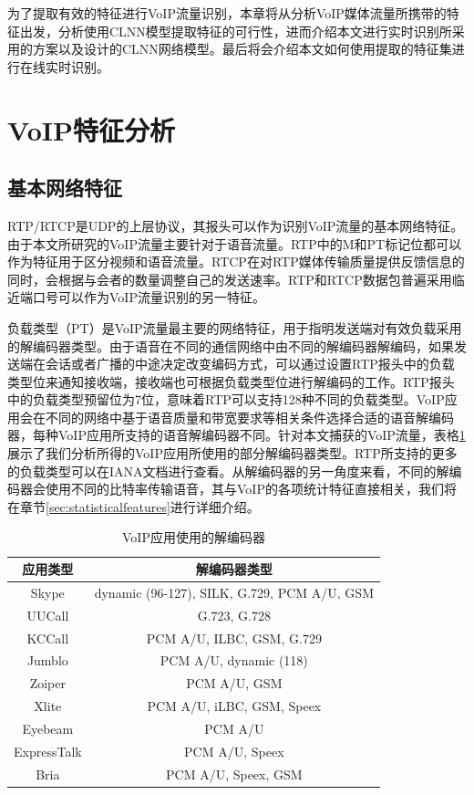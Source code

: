 为了提取有效的特征进行VoIP流量识别，本章将从分析VoIP媒体流量所携带的特征出发，分析使用CLNN模型提取特征的可行性，进而介绍本文进行实时识别所采用的方案以及设计的CLNN网络模型。最后将会介绍本文如何使用提取的特征集进行在线实时识别。
\section{VoIP特征分析}

\subsection{基本网络特征}
RTP/RTCP是UDP的上层协议，其报头可以作为识别VoIP流量的基本网络特征。由于本文所研究的VoIP流量主要针对于语音流量。RTP中的M和PT标记位都可以作为特征用于区分视频和语音流量。RTCP在对RTP媒体传输质量提供反馈信息的同时，会根据与会者的数量调整自己的发送速率。RTP和RTCP数据包普遍采用临近端口号可以作为VoIP流量识别的另一特征。

负载类型（PT）是VoIP流量最主要的网络特征，用于指明发送端对有效负载采用的解编码器类型。由于语音在不同的通信网络中由不同的解编码器解编码，如果发送端在会话或者广播的中途决定改变编码方式，可以通过设置RTP报头中的负载类型位来通知接收端，接收端也可根据负载类型位进行解编码的工作。RTP报头中的负载类型预留位为7位，意味着RTP可以支持128种不同的负载类型。VoIP应用会在不同的网络中基于语音质量和带宽要求等相关条件选择合适的语音解编码器，每种VoIP应用所支持的语音解编码器不同。针对本文捕获的VoIP流量，表格\ref{tab:codecs}展示了我们分析所得的VoIP应用所使用的部分解编码器类型。RTP所支持的更多的负载类型可以在IANA文档\supercite{rtppt}进行查看。从解编码器的另一角度来看，不同的解编码器会使用不同的比特率传输语音，其与VoIP的各项统计特征直接相关，我们将在章节\ref{sec:statisticalfeatures}进行详细介绍。

\begin{table}[htbp]
  \caption{VoIP应用使用的解编码器}
  \label{tab:codecs}
  \centering
  \begin{tabular}{c c}
    \hline
    \textbf{应用类型} & \textbf{解编码器类型}\\
    \hline
    Skype      & dynamic (96-127), SILK, G.729, PCM A/U, GSM  \\
    UUCall      & G.723, G.728  \\
    KCCall      & PCM A/U, ILBC, GSM, G.729  \\
    Jumblo      & PCM A/U, dynamic (118)  \\
    Zoiper      & PCM A/U, GSM  \\
    Xlite      &  PCM A/U, iLBC, GSM, Speex \\
    Eyebeam      & PCM A/U  \\
    ExpressTalk      & PCM A/U, Speex  \\
    Bria      & PCM A/U, Speex, GSM  \\
    \hline
  \end{tabular}
\end{table}



